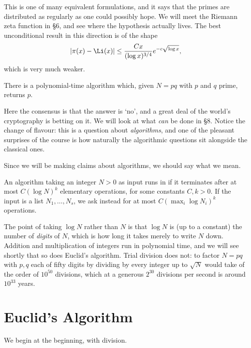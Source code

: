 This is one of many equivalent formulations, and it says that the primes are distributed as regularly as one could possibly hope. We will meet the Riemann zeta function in \S6, and see where the hypothesis actually lives. The best unconditional result in this direction is of the shape
$$
|\pi(x) - \Li(x)| \leq \frac{Cx}{(\log x)^{3/4}} e^{-c \sqrt{\log x}},
$$
which is very much weaker.

\begin{conjecture}
	There is a polynomial-time algorithm which, given $N = pq$ with $p$ and $q$ prime, returns $p$.
\end{conjecture}

Here the consensus is that the answer is `no', and a great deal of the world's cryptography is betting on it. We will look at what \emph{can} be done in \S8. Notice the change of flavour: this is a question about \emph{algorithms}, and one of the pleasant surprises of the course is how naturally the algorithmic questions sit alongside the classical ones.

Since we will be making claims about algorithms, we should say what we mean.

\begin{definition}
	An algorithm taking an integer $N > 0$ as input runs in  if it terminates after at most $C(\log N)^k$ elementary operations, for some constants $C, k > 0$. If the input is a list $N_1, \dots, N_s$, we ask instead for at most $C(\max_i \log N_i)^k$ operations.
\end{definition}

The point of taking $\log N$ rather than $N$ is that $\log N$ is (up to a constant) the number of \emph{digits} of $N$, which is how long it takes merely to write $N$ down. Addition and multiplication of integers run in polynomial time, and we will see shortly that so does Euclid's algorithm. Trial division does not: to factor $N = pq$ with $p, q$ each of fifty digits by dividing by every integer up to $\sqrt{N}$ would take of the order of $10^{50}$ divisions, which at a generous $2^{30}$ divisions per second is around $10^{33}$ years.

\section{Euclid's Algorithm}

We begin at the beginning, with division.

